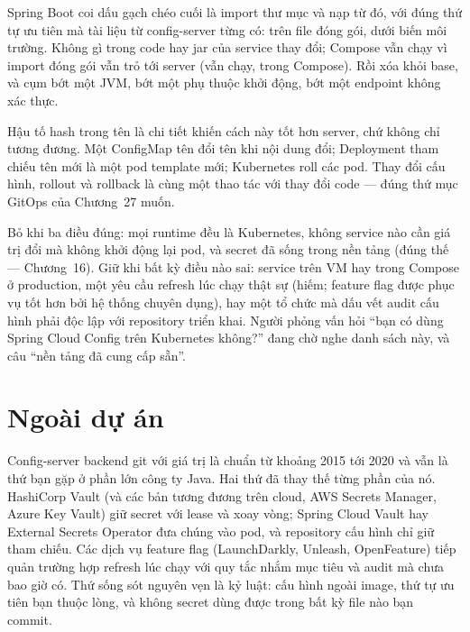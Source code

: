 Spring Boot coi dấu gạch chéo cuối là import thư mục và nạp
 từ đó, với đúng thứ tự ưu tiên mà tài liệu từ
config-server từng có: trên file đóng gói, dưới biến môi trường. Không
gì trong code hay jar của service thay đổi; Compose vẫn chạy vì import
 đóng gói vẫn trỏ tới server (vẫn chạy,
trong Compose). Rồi xóa  khỏi base, và cụm bớt
một JVM, bớt một phụ thuộc khởi động, bớt một endpoint không xác thực.

Hậu tố hash trong tên là chi tiết khiến cách này tốt hơn server, chứ
không chỉ tương đương. Một ConfigMap tên
 đổi tên khi nội dung đổi; Deployment
tham chiếu tên mới là một pod template mới; Kubernetes roll các pod.
Thay đổi cấu hình, rollout và rollback là cùng một thao tác với thay đổi
code --- đúng thứ mục GitOps của Chương~27 muốn.

\begin{decision}
Bỏ khi ba điều đúng: mọi runtime đều là Kubernetes, không service nào
cần giá trị đổi mà không khởi động lại pod, và secret đã sống trong nền
tảng (đúng thế --- Chương~16). Giữ khi bất kỳ điều nào sai: service
trên VM hay trong Compose ở production, một yêu cầu refresh lúc chạy
thật sự (hiếm; feature flag được phục vụ tốt hơn bởi hệ thống chuyên
dụng), hay một tổ chức mà dấu vết audit cấu hình phải độc lập với
repository triển khai. Người phỏng vấn hỏi ``bạn có dùng Spring Cloud
Config trên Kubernetes không?'' đang chờ nghe danh sách này, và câu
``nền tảng đã cung cấp sẵn''.
\end{decision}

\section{Ngoài dự án}

Config-server backend git với giá trị  là chuẩn từ
khoảng 2015 tới 2020 và vẫn là thứ bạn gặp ở phần lớn công ty Java. Hai
thứ đã thay thế từng phần của nó. HashiCorp Vault (và các bản tương
đương trên cloud, AWS Secrets Manager, Azure Key Vault) giữ secret với
lease và xoay vòng; Spring Cloud Vault hay External Secrets Operator
đưa chúng vào pod, và repository cấu hình chỉ giữ tham chiếu. Các dịch
vụ feature flag (LaunchDarkly, Unleash, OpenFeature) tiếp quản trường
hợp refresh lúc chạy với quy tắc nhắm mục tiêu và audit mà
 chưa bao giờ có. Thứ sống sót nguyên vẹn là kỷ
luật: cấu hình ngoài image, thứ tự ưu tiên bạn thuộc lòng, và không
secret dùng được trong bất kỳ file nào bạn commit.

